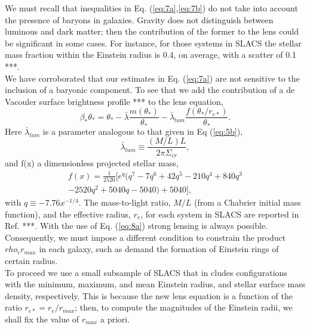 \documentclass[10pt, letterpaper]{article}
\begin{document}
\begin{multicols}{2}
		We must recall that inequalities in Eq. (\ref{eq:7a},\ref{eq:7b})  do not take into account the presence of baryons in galaxies. Gravity does not distinguish between luminous and dark matter; then the contribution of the former to the lens could be significant in some cases. For instance, for those systems in SLACS the stellar mass fraction within the Einstein radius is 0.4, on average, with a scatter of 0.1 ***.\\
		We have corroborated that our estimates in Eq. (\ref{eq:7a})  are not sensitive to the inclusion of a baryonic component. To see that we add the contribution of a de Vacouler surface brightness profile *** to the lens equation,
		\begin{equation}\tag{8a}\label{eq:8a}
			\beta_*\theta_*=\theta_*-\bar{\lambda} \frac{m(\theta_*)}{\theta_*}-\bar{\lambda}_{lum} \frac{f(\theta_* / r_{e *})}{\theta_*}.
		\end{equation}
		Here $\bar{\lambda}_{lum}$ is a parameter analogous to that given in
		Eq (\ref{eq:5b}),
		\begin{equation}\tag{8b}\label{eq:8b}
			\bar{\lambda}_{lum} \equiv \frac{(M/L)L}{2\pi\Sigma_{cr}},
		\end{equation}
		and f(x) a dimensionless projected stellar mass,
		\begin{multline*}\tag{8c}\label{eq:8c}
			f(x)=\frac{1}{2520}[e ^q (q^7 - 7 q^6 + 42 q^5 - 210 q^4 + 840 q^3 \\ - 2520 q^2 +  5040q -  5040) +  5040],
		\end{multline*}
		with $q \equiv -7.76 x^{-1/4}$. The mass-to-light ratio, $M/L$ (from a Chabrier initial mass function), and the effective radius, $r_e$,  for each system in SLACS are reported in Ref. ***. With the use of Eq. (\ref{eq:8a}) strong lensing is always possible. Consequently, we must impose a different condition to constrain the product $rho_c r_{max}$ in each galaxy, such as demand the formation of Einstein rings of certain radius.\\
		To proceed we use a small subsample of SLACS that in cludes configurations with the minimum, maximum, and mean Einstein radius, and stellar surface mass density, respectively. This is because the new lens equation is a function of the ratio $r_{e*}=r_e / r_{max}$; then, to compute the magnitudes of the Einstein radii, we shall fix the value of $r_{max}$ a priori.\\

\end{multicols}
\end{document}
